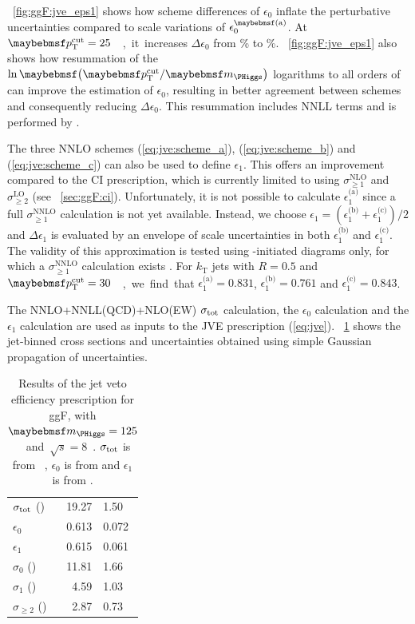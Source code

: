 \Figure~\ref{fig:ggF:jve_eps1} shows how scheme differences of $\epsilon_0$ inflate the 
perturbative uncertainties compared to scale variations of 
$\epsilon_0^{\parenths{\text{a}}}$. At \unit{$\ptcut = 25$}{\GeV}, it increases 
$\Delta\epsilon_0$ from \% to \%. \Figure~\ref{fig:ggF:jve_eps1} also shows 
how resummation of the $\ln\parenths{\ptcut/\mH}$ logarithms to all orders of \alphaS can 
improve the estimation of $\epsilon_0$, resulting in better agreement between schemes and 
consequently reducing $\Delta\epsilon_0$. This resummation includes NNLL terms and is 
performed by \jetvheto \cite{JVE:NNLL}.

The three NNLO schemes (\ref{eq:jve:scheme_a}), (\ref{eq:jve:scheme_b}) and 
(\ref{eq:jve:scheme_c}) can also be used to define $\epsilon_1$. This offers an improvement 
compared to the CI prescription, which is currently limited to using 
$\sigma_{\geq1}^{\text{NLO}}$ and $\sigma_{\geq2}^{\text{LO}}$ (see 
\Section~\ref{sec:ggF:ci}). Unfortunately, it is not possible to calculate 
$\epsilon_1^{\text{(a)}}$ since a full $\sigma_{\geq1}^{\text{NNLO}}$ calculation is not 
yet available. Instead, we choose $\epsilon_1 = (\epsilon_1^{\text{(b)}} + 
\epsilon_1^{\text{(c)}})/2$ and $\Delta\epsilon_1$ is evaluated by an envelope of scale 
uncertainties in both $\epsilon_1^{\text{(b)}}$ and $\epsilon_1^{\text{(c)}}$.
The validity of this approximation is tested using \HepProcess{\Pgluon\Pgluon}-initiated 
diagrams only, for which a $\sigma_{\geq1}^{\text{NNLO}}$ calculation exists 
\cite{H+1j:NNLO}. For $k_{\text{T}}$ jets with $R = 0.5$ and \unit{$\ptcut = 30$}{\GeV}, we 
find that $\epsilon_1^{\text{(a)}} = 0.831$, $\epsilon_1^{\text{(b)}} = 0.761$ and 
$\epsilon_1^{\text{(c)}} = 0.843$.

The NNLO+NNLL(QCD)+NLO(EW) $\sigma_{\text{tot}}$ calculation, the \jetvheto $\epsilon_0$ 
calculation and the \mcfm $\epsilon_1$ calculation are used as inputs to the JVE 
prescription (\ref{eq:jve}). \Table~\ref{tab:ggF:jve} shows the jet-binned cross sections 
and uncertainties obtained using simple Gaussian propagation of uncertainties.

\begin{table}[t]
	\begin{tabular}{l@{\hskip 0.3in}r@{$\,\pm\,$}l}
		\toprule
		$\sigma_{\text{tot}}$ (\pico\barn) & 19.27 & 1.50 \\
		$\epsilon_0$                   & 0.613 & 0.072 \\
		$\epsilon_1$                   & 0.615 & 0.061 \\
		\midrule
		$\sigma_0$ (\pico\barn)        & 11.81 & 1.66 \\
		$\sigma_1$ (\pico\barn)        &  4.59 & 1.03 \\
		$\sigma_{\geq2}$ (\pico\barn)  &  2.87 & 0.73 \\
		\bottomrule
	\end{tabular}
	\caption{Results of the jet veto efficiency prescription for ggF, with 
	\unit{$\mH = 125$}{\GeV} and \unit{$\sqrt{s} = 8$}{\TeV}. $\sigma_{\text{tot}}$ is from 
	\Reference~\cite{YR3}, $\epsilon_0$ is from \jetvheto and $\epsilon_1$ is from \mcfm.}
	\label{tab:ggF:jve}
\end{table}

